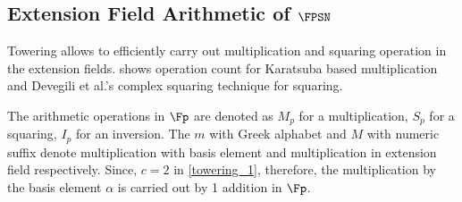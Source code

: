\subsection{Extension Field Arithmetic of $\FPSN$}
Towering allows to efficiently carry out multiplication and squaring operation in the extension fields.
 shows operation count for Karatsuba based multiplication and Devegili et al.'s \cite{devegili2006multiplication} complex squaring technique for squaring. 
\renewcommand{\baselinestretch}{1.5}
\begin{table}[t]
\caption{Number of arithmetic operations in  $\FPSN$ based on Type-I towering \eqref{towering_1}.}
\label{tab_fpoperation}
	\centering
\end{table}
\renewcommand{\baselinestretch}{1.0}
The arithmetic operations in $\Fp$ are denoted as $M_p$ for a multiplication, $S_p$ for a squaring, $I_p$ for an inversion.
The $m$ with Greek alphabet and $M$ with numeric suffix denote multiplication with basis element and multiplication in extension field respectively.
Since, $c=2$ in \eqref{towering_1}, therefore, the multiplication by the basis element $\alpha$ is carried out by 1 addition in $\Fp$.

